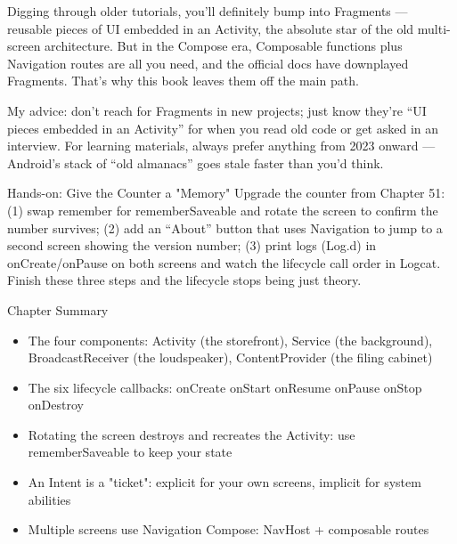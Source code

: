 
Digging through older tutorials, you'll definitely bump into Fragments — reusable pieces of UI embedded in an Activity, the absolute star of the old multi-screen architecture. But in the Compose era, Composable functions plus Navigation routes are all you need, and the official docs have downplayed Fragments. That's why this book leaves them off the main path.

My advice: don't reach for Fragments in new projects; just know they're “UI pieces embedded in an Activity” for when you read old code or get asked in an interview. For learning materials, always prefer anything from 2023 onward — Android's stack of “old almanacs” goes stale faster than you'd think.

\begin{tcbpractice}{Hands-on: Give the Counter a "Memory"}
Upgrade the counter from Chapter 51: (1) swap remember for rememberSaveable and rotate the screen to confirm the number survives; (2) add an “About” button that uses Navigation to jump to a second screen showing the version number; (3) print logs (Log.d) in onCreate/onPause on both screens and watch the lifecycle call order in Logcat. Finish these three steps and the lifecycle stops being just theory.

\end{tcbpractice}

\begin{tcbsummary}{Chapter Summary}
\begin{itemize}
  \item The four components: Activity (the storefront), Service (the background), BroadcastReceiver (the loudspeaker), ContentProvider (the filing cabinet)
  \item The six lifecycle callbacks: onCreate onStart onResume onPause onStop onDestroy
  \item Rotating the screen destroys and recreates the Activity: use rememberSaveable to keep your state
  \item An Intent is a "ticket": explicit for your own screens, implicit for system abilities
  \item Multiple screens use Navigation Compose: NavHost + composable routes
\end{itemize}

\end{tcbsummary}
